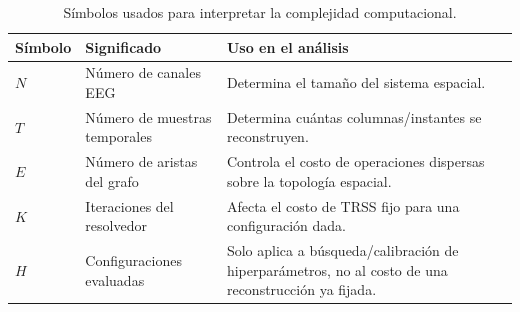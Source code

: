 \begin{table}[htbp]
\centering
\small
\caption{Símbolos usados para interpretar la complejidad computacional.}
\label{tab:ch4_complexity_symbols}
\begin{tabular}{@{}llp{6.2cm}@{}}
\toprule
Símbolo & Significado & Uso en el análisis \\
\midrule
$N$ & Número de canales EEG & Determina el tamaño del sistema espacial. \\
$T$ & Número de muestras temporales & Determina cuántas columnas/instantes se reconstruyen. \\
$E$ & Número de aristas del grafo & Controla el costo de operaciones dispersas sobre la topología espacial. \\
$K$ & Iteraciones del resolvedor & Afecta el costo de TRSS fijo para una configuración dada. \\
$H$ & Configuraciones evaluadas & Solo aplica a búsqueda/calibración de hiperparámetros, no al costo de una reconstrucción ya fijada. \\
\bottomrule
\end{tabular}
\end{table}
